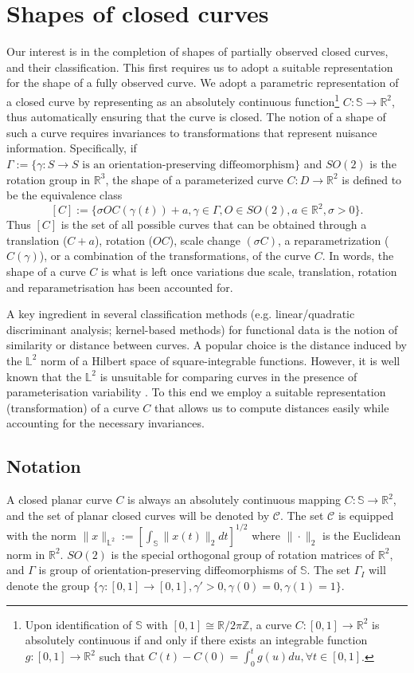 \documentclass[11pt]{amsart}
\newcommand{\C}{C}
\newcommand{\Rtwo}{\mathbb{R}^2}
\newcommand{\ltwo}{\mathbb{L}^2}
\newcommand{\uc}{\mathbb{S}}
\theoremstyle{definition}
\begin{document}
\section{Shapes of closed curves}
Our interest is in the completion of shapes of partially observed closed curves, and their classification. This first requires us to adopt a suitable representation for the shape of a fully observed curve. We adopt a parametric representation of a closed curve by representing as an absolutely continuous function\footnote{Upon identification of $\uc$ with $[0,1] \cong \mathbb{R}/2\pi\mathbb{Z}$, a curve $\C:[0,1] \to \mathbb{R}^2$ is absolutely continuous if and only if there exists an integrable function $g:[0,1]\to \Rtwo$ such that $\C(t)-\C(0)=\int_0^tg(u)du, \forall t \in [0,1]$.} $\C: \uc \to \Rtwo$, thus automatically ensuring that the curve is closed. The notion of a shape of such a curve requires invariances to transformations that represent nuisance information. Specifically, if $\Gamma:=\{\gamma:S \to S \text{ is an orientation-preserving diffeomorphism}\}$ and $SO(2)$ is the rotation group in $\mathbb{R}^3$, the shape of a parameterized curve $\C:D \to \Rtwo$ is defined to be the equivalence class 
\[
[\C]:=\Big\{\sigma O \C(\gamma(t))+a, \gamma \in \Gamma, O \in SO(2), a \in \Rtwo, \sigma >0\Big\}.
\]
Thus $[\C]$ is the set of all possible curves that can be obtained through a translation ($\C+a$), rotation ($O\C$), scale change $(\sigma \C)$, a reparametrization ($C(\gamma)$), or a combination of the transformations, of the curve $C$. In words, the shape of a curve $C$ is what is left once variations due scale, translation, rotation and reparametrisation has been accounted for. 


A key ingredient in several classification methods (e.g. linear/quadratic discriminant analysis; kernel-based methods) for functional data is the notion of similarity or distance between curves. A popular choice is the distance induced by the $\mathbb{L}^2$ norm of a Hilbert space of square-integrable functions. However, it is well known that the $\mathbb{L}^2$ is unsuitable for comparing curves in the presence of parameterisation variability \citep{KurtekJASA, AK}. To this end we employ a suitable representation (transformation) of a curve $\C$ that allows us to compute distances easily while accounting for the necessary invariances. 

\subsection{Notation}
A closed planar curve $C$ is always an absolutely continuous mapping $C:\uc \to \Rtwo$, and the set of planar closed curves will be denoted by $\mathcal{C}$. The set $\mathcal{C}$ is equipped with the norm $\|x\|_{\ltwo}:=[\int_\uc \|x(t)\|_2dt]^{1/2}$ where $\|\cdot\|_2$ is the Euclidean norm in $\Rtwo$. $SO(2)$ is the special orthogonal group of rotation matrices of $\Rtwo$, and $\Gamma$ is group of orientation-preserving diffeomorphisms of $\uc$. The set $\Gamma_I$ will denote the group $\{\gamma:[0,1]\to[0,1], \gamma'>0,\gamma(0)=0, \gamma(1)=1\}$. 
\end{document}
